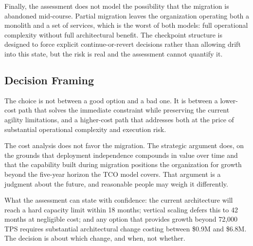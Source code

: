 Finally, the assessment does not model the possibility that the migration is abandoned mid-course. Partial migration leaves the organization operating both a monolith and a set of services, which is the worst of both models: full operational complexity without full architectural benefit. The checkpoint structure is designed to force explicit continue-or-revert decisions rather than allowing drift into this state, but the risk is real and the assessment cannot quantify it.

\subsection{Decision Framing}

The choice is not between a good option and a bad one. It is between a lower-cost path that solves the immediate constraint while preserving the current agility limitations, and a higher-cost path that addresses both at the price of substantial operational complexity and execution risk.

The cost analysis does not favor the migration. The strategic argument does, on the grounds that deployment independence compounds in value over time and that the capability built during migration positions the organization for growth beyond the five-year horizon the TCO model covers. That argument is a judgment about the future, and reasonable people may weigh it differently.

What the assessment can state with confidence: the current architecture will reach a hard capacity limit within 18 months; vertical scaling defers this to 42 months at negligible cost; and any option that provides growth beyond 72,000 TPS requires substantial architectural change costing between \$0.9M and \$6.8M. The decision is about which change, and when, not whether.
